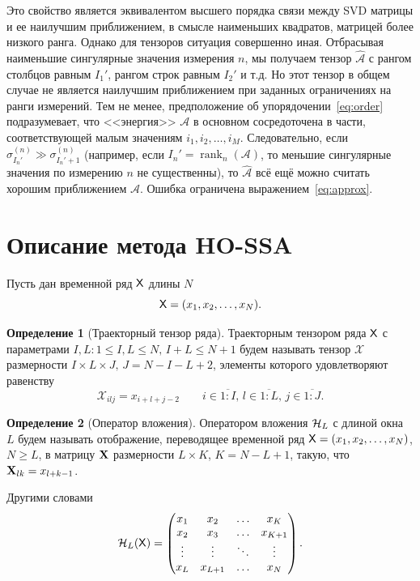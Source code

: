 \documentclass[specialist,
    substylefile = spbu_report.rtx,
    subf,href,colorlinks=true, 12pt]{disser}
\theoremstyle{plain}
\theoremstyle{definition}
\newtheorem{definition}{Определение}[section]
\theoremstyle{remark}
\begin{document}
    Это свойство является эквивалентом высшего порядка связи между SVD матрицы и ее наилучшим приближением,
    в смысле наименьших квадратов, матрицей более низкого ранга.
    Однако для тензоров ситуация совершенно иная.
    Отбрасывая наименьшие сингулярные значения измерения $n$, мы получаем тензор $\hat{\mathcal{A}}$ с рангом столбцов
    равным $I_1'$, рангом строк равным $I_2'$ и т.д.
    Но этот тензор в общем случае не является наилучшим приближением при заданных ограничениях на ранги измерений.
    Тем не менее, предположение об упорядочении~\eqref{eq:order} подразумевает, что <<энергия>> $\mathcal{A}$ в основном сосредоточена в части,
    соответствующей малым значениям $i_1, i_2, \ldots, i_M$.
    Следовательно, если $\sigma^{(n)}_{I_n'} \gg \sigma^{(n)}_{I_n'+1}$ (например, если $I_n'=\operatorname{rank}_n(\mathcal{A})$,
    то меньшие сингулярные значения по измерению $n$ не существенны), то $\hat{\mathcal{A}}$ всё ещё можно считать хорошим приближением $\mathcal{A}$.
    Ошибка ограничена выражением~\eqref{eq:approx}.


    \section{Описание метода HO-SSA}\label{sec:HO-SSA-method-description}
    Пусть дан временной ряд $\mathsf{X}$ длины $N$
    \[
        \mathsf{X}=(x_1,x_2,\ldots,x_N).
    \]
    \begin{definition}[Траекторный тензор ряда]
        Траекторным тензором ряда $\mathsf{X}$ с параметрами $I,L: 1\leqslant I,L \leqslant N,\, I + L \leqslant N + 1$
        будем называть тензор $\mathcal{X}$ размерности $I\times L \times J,\, J=N-I-L+2$, элементы которого удовлетворяют равенству
        \[
            \mathcal{X}_{ilj}=x_{i+l+j-2}\qquad i\in \overline{1:I},\, l \in\overline{1:L},\, j \in\overline{1:J}.
        \]
    \end{definition}
    \begin{definition}[Оператор вложения]
        \label{def:injection-op}
        Оператором вложения $\mathcal{H}_L$ с длиной окна $L$ будем называть отображение, переводящее временной ряд
        $\mathsf{X}=(x_1, x_2,\ldots, x_N)$, $N \geqslant L$, в матрицу $\mathbf{X}$ размерности $L\times K$, $K = N-L+1$,
        такую, что $\mathbf{X}_{lk}=x_{l+k-1}$.

        Другими словами
        \[
            \mathcal{H}_L(\mathsf{X}) =
            \begin{pmatrix}
                x_1    & x_2     & \ldots & x_K     \\
                x_2    & x_3     & \ldots & x_{K+1} \\
                \vdots & \vdots  & \ddots & \vdots  \\
                x_L    & x_{L+1} & \ldots & x_N
            \end{pmatrix}.
        \]
    \end{definition}
\end{document}
